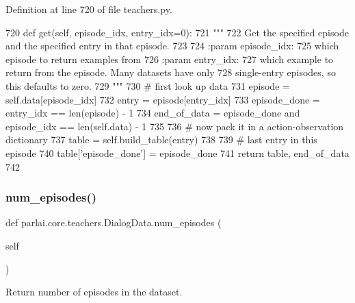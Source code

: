Definition at line 720 of file teachers.\+py.


\begin{DoxyCode}
720     \textcolor{keyword}{def }get(self, episode\_idx, entry\_idx=0):
721         \textcolor{stringliteral}{"""}
722 \textcolor{stringliteral}{        Get the specified episode and the specified entry in that episode.}
723 \textcolor{stringliteral}{}
724 \textcolor{stringliteral}{        :param episode\_idx:}
725 \textcolor{stringliteral}{            which episode to return examples from}
726 \textcolor{stringliteral}{        :param entry\_idx:}
727 \textcolor{stringliteral}{            which example to return from the episode. Many datasets have only}
728 \textcolor{stringliteral}{            single-entry episodes, so this defaults to zero.}
729 \textcolor{stringliteral}{        """}
730         \textcolor{comment}{# first look up data}
731         episode = self.data[episode\_idx]
732         entry = episode[entry\_idx]
733         episode\_done = entry\_idx == len(episode) - 1
734         end\_of\_data = episode\_done \textcolor{keywordflow}{and} episode\_idx == len(self.data) - 1
735 
736         \textcolor{comment}{# now pack it in a action-observation dictionary}
737         table = self.build\_table(entry)
738 
739         \textcolor{comment}{# last entry in this episode}
740         table[\textcolor{stringliteral}{'episode\_done'}] = episode\_done
741         \textcolor{keywordflow}{return} table, end\_of\_data
742 
\end{DoxyCode}
\mbox{\label{classparlai_1_1core_1_1teachers_1_1DialogData_a83e3457f29a54ec455ad76f7eab6cfc4}} 
\subsubsection{\texorpdfstring{num\+\_\+episodes()}{num\_episodes()}}
{\footnotesize\ttfamily def parlai.\+core.\+teachers.\+Dialog\+Data.\+num\+\_\+episodes (\begin{DoxyParamCaption}\item[{}]{self }\end{DoxyParamCaption})}

\begin{DoxyVerb}Return number of episodes in the dataset.
\end{DoxyVerb}
 

